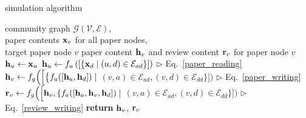 \begin{algorithm}
\small
\caption{\small \envname simulation algorithm}
\label{alg:paper_brainstorming}
\begin{algorithmic}[1]
\REQUIRE community graph $\mathcal{G}(\mathcal{V}, \mathcal{E})$,\\ 
         \hspace{2.6em}paper contents $\mathbf{x}_v$ for all paper nodes,\\ 
         \hspace{2.6em}target paper node $v$
\ENSURE paper content $\mathbf{h}_v$ and review content $\mathbf{r}_v$ for paper node $v$
        \STATE $\mathbf{h}_u \gets \mathbf{x}_u$
    \ELSE
        \STATE $\mathbf{h}_{u} \gets f_u\left(\left[\left\{\mathbf{x}_d \mid (u,d) \in \mathcal{E}_{ad}\right\}\right]\right)$ \hfill $\triangleright$ Eq.~\eqref{paper_reading}
    \ENDIF
\ENDFOR
\STATE $\mathbf{h}_{v} \gets f_g\Big(\Big[\big\{f_a([\mathbf{h}_a, \mathbf{h}_d]) \mid$ 
    \STATE \quad\quad $(v,a) \in \mathcal{E}_{ad}, (v,d) \in \mathcal{E}_{dd}\big\}\Big]\Big)$ \hfill $\triangleright$ Eq.~\eqref{paper_writing}
\STATE $\mathbf{r}_{v} \gets f_g\Big(\Big[\mathbf{h}_v, \{f_a([\mathbf{h}_a, \mathbf{h}_v, \mathbf{h}_d]) \mid$ 
    \STATE \quad\quad $(v,a) \in \mathcal{E}_{ad}, (v,d) \in \mathcal{E}_{dd}\}\Big]\Big)$ \hfill $\triangleright$ Eq.~\eqref{review_writing}
\STATE \textbf{return} $\mathbf{h}_v$, $\mathbf{r}_v$ 
\end{algorithmic}
\end{algorithm}
\vspace{-3mm}




